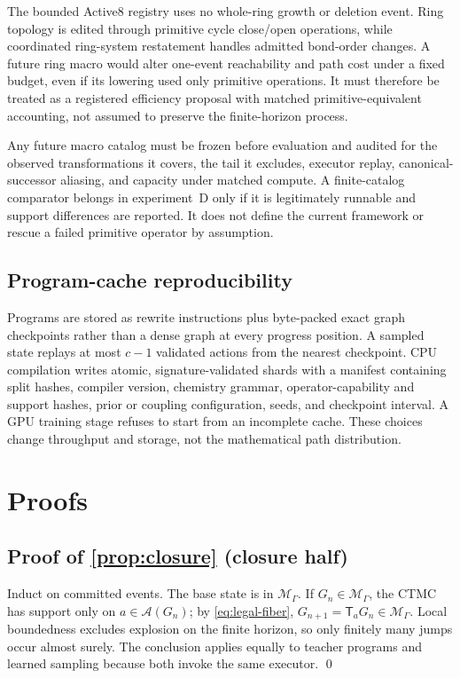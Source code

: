 \documentclass{article}
\newcommand{\M}{\mathcal{M}_{\Gamma}}
\newcommand{\A}{\mathcal{A}}
\newcommand{\T}{\mathsf{T}}
\theoremstyle{definition}
\theoremstyle{remark}
\begin{document}
The bounded Active8 registry uses no whole-ring growth or deletion event. Ring topology is edited through primitive cycle close/open operations, while coordinated ring-system restatement handles admitted bond-order changes. A future ring macro would alter one-event reachability and path cost under a fixed budget, even if its lowering used only primitive operations. It must therefore be treated as a registered efficiency proposal with matched primitive-equivalent accounting, not assumed to preserve the finite-horizon process.

Any future macro catalog must be frozen before evaluation and audited for the observed transformations it covers, the tail it excludes, executor replay, canonical-successor aliasing, and capacity under matched compute. A finite-catalog comparator belongs in experiment~D only if it is legitimately runnable and support differences are reported. It does not define the current framework or rescue a failed primitive operator by assumption.

\subsection{Program-cache reproducibility}

Programs are stored as rewrite instructions plus byte-packed exact graph checkpoints rather than a dense graph at every progress position. A sampled state replays at most $c-1$ validated actions from the nearest checkpoint. CPU compilation writes atomic, signature-validated shards with a manifest containing split hashes, compiler version, chemistry grammar, operator-capability and support hashes, prior or coupling configuration, seeds, and checkpoint interval. A GPU training stage refuses to start from an incomplete cache. These choices change throughput and storage, not the mathematical path distribution.

\section{Proofs}\label{app:proofs}

\subsection{Proof of \cref{prop:closure} (closure half)}

Induct on committed events. The base state is in $\M$. If $G_n\in\M$, the CTMC has support only on $a\in\A(G_n)$; by \eqref{eq:legal-fiber}, $G_{n+1}=\T_aG_n\in\M$. Local boundedness excludes explosion on the finite horizon, so only finitely many jumps occur almost surely. The conclusion applies equally to teacher programs and learned sampling because both invoke the same executor. \qed
\end{document}
